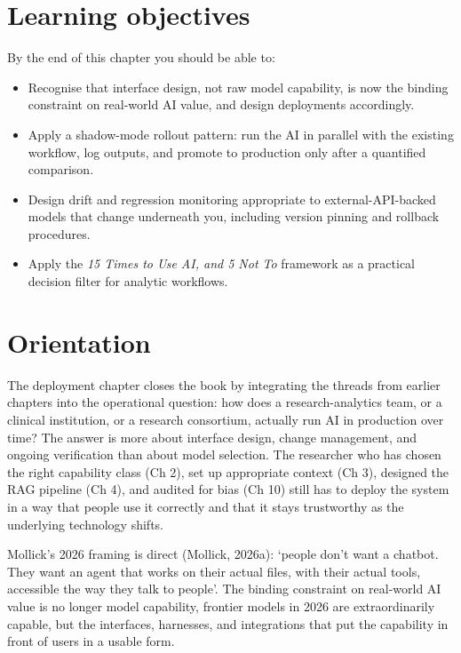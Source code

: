 \documentclass[
  letterpaper,
  11pt]{scrbook}
\providecommand{\tightlist}{%
  \setlength{\itemsep}{0pt}\setlength{\parskip}{0pt}}
\begin{document}
\section{Learning objectives}\label{learning-objectives-13}

By the end of this chapter you should be able to:

\begin{itemize}
\tightlist
\item
  Recognise that interface design, not raw model capability, is now the
  binding constraint on real-world AI value, and design deployments
  accordingly.
\item
  Apply a shadow-mode rollout pattern: run the AI in parallel with the
  existing workflow, log outputs, and promote to production only after a
  quantified comparison.
\item
  Design drift and regression monitoring appropriate to
  external-API-backed models that change underneath you, including
  version pinning and rollback procedures.
\item
  Apply the \emph{15 Times to Use AI, and 5 Not To} framework as a
  practical decision filter for analytic workflows.
\end{itemize}

\section{Orientation}\label{orientation-13}

The deployment chapter closes the book by integrating the threads from
earlier chapters into the operational question: how does a
research-analytics team, or a clinical institution, or a research
consortium, actually run AI in production over time? The answer is more
about interface design, change management, and ongoing verification than
about model selection. The researcher who has chosen the right
capability class (Ch 2), set up appropriate context (Ch 3), designed the
RAG pipeline (Ch 4), and audited for bias (Ch 10) still has to deploy
the system in a way that people use it correctly and that it stays
trustworthy as the underlying technology shifts.

Mollick's 2026 framing is direct (Mollick, 2026a): `people don't want a
chatbot. They want an agent that works on their actual files, with their
actual tools, accessible the way they talk to people'. The binding
constraint on real-world AI value is no longer model capability,
frontier models in 2026 are extraordinarily capable, but the interfaces,
harnesses, and integrations that put the capability in front of users in
a usable form.
\end{document}
